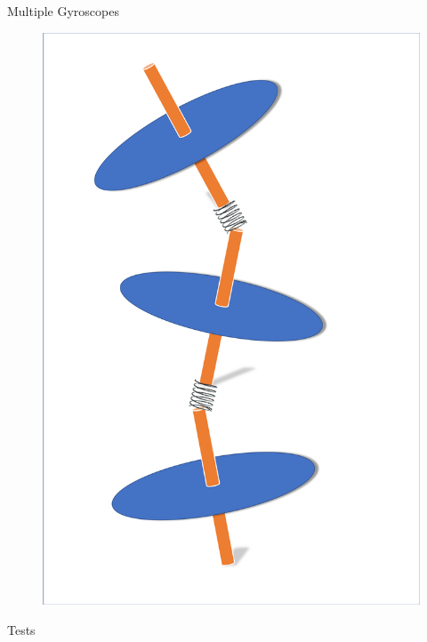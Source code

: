 \documentclass[10pt]{beamer}
\begin{document}
\begin{frame}{Multiple Gyroscopes}


\begin{figure}
	\begin{minipage}{0.48\textwidth}
		\centering
		\includegraphics[width=\textwidth]{stack_model.png}
	\end{minipage}
\end{figure}

\end{frame}


\begin{frame}{Tests}

\end{frame}
\end{document}
